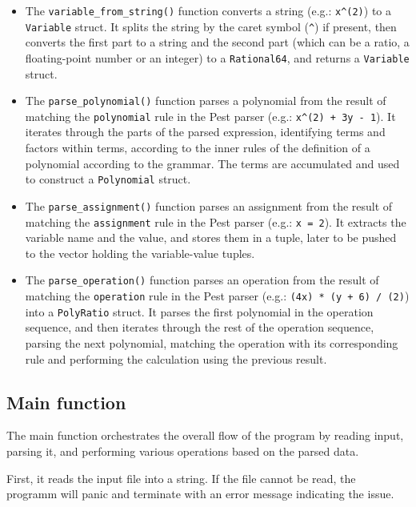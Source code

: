 \begin{itemize}
    \item The \verb|variable_from_string()| function converts a string (e.g.: \verb|x^(2)|) to a \verb|Variable| struct. It splits the string by the caret symbol (\verb|^|) if present, then converts the first part to a string and the second part (which can be a ratio, a floating-point number or an integer) to a \verb|Rational64|, and returns a \verb|Variable| struct.
    \item The \verb|parse_polynomial()| function parses a polynomial from the result of matching the \verb|polynomial| rule in the Pest parser (e.g.: \verb|x^(2) + 3y - 1|). It iterates through the parts of the parsed expression, identifying terms and factors within terms, according to the inner rules of the definition of a polynomial according to the grammar. The terms are accumulated and used to construct a \verb|Polynomial| struct.
    \item The \verb|parse_assignment()| function parses an assignment from the result of matching the \verb|assignment| rule in the Pest parser (e.g.: \verb|x = 2|). It extracts the variable name and the value, and stores them in a tuple, later to be pushed to the vector holding the variable-value tuples.
    \item The \verb|parse_operation()| function parses an operation from the result of matching the \verb|operation| rule in the Pest parser (e.g.: \verb|(4x) * (y + 6) / (2)|) into a \verb|PolyRatio| struct. It parses the first polynomial in the operation sequence, and then iterates through the rest of the operation sequence, parsing the next polynomial, matching the operation with its corresponding rule and performing the calculation using the previous result.
\end{itemize}



\subsection{Main function}\label{subsec:main-function}

The main function orchestrates the overall flow of the program by reading input, parsing it, and performing various operations based on the parsed data.

First, it reads the input file into a string. If the file cannot be read, the programm will panic and terminate with an error message indicating the issue.

